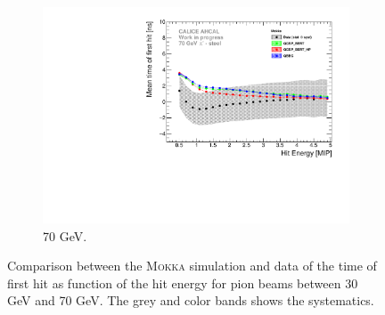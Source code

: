 \documentclass{JINST}
\newcommand\mokka{\textsc{Mokka}\xspace}
\begin{document}
\begin{figure}[htbp!]
\begin{subfigure}[t]{0.49\textwidth}
    \centering
    \includegraphics[width=1\textwidth]{fig/Time_Energy_70GeV_Mokka.pdf}
    \caption{70 GeV.} \label{fig:Energy_SimData_70GeV}
  \end{subfigure}
  \caption{Comparison between the \mokka simulation and data of the time of first hit as function of the hit energy for pion beams between 30 GeV and 70 GeV. The grey and color bands shows the systematics.}
\end{figure}
\end{document}
